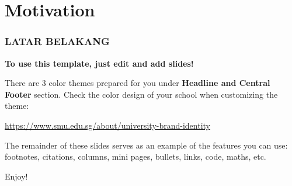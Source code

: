 \section{Motivation} %

\begin{frame}
    \frametitle{LATAR BELAKANG}
    \begin{center}
        \textbf{To use this template, just edit and add slides!} \newline
    \end{center}

    There are 3 color themes prepared for you under \textbf{Headline and Central Footer} section. 
    Check the color design of your school when customizing the theme: \newline



    \begin{center}
        \href{https://www.smu.edu.sg/about/university-brand-identity}{https://www.smu.edu.sg/about/university-brand-identity} \newline
    \end{center}

    The remainder of these slides serves as an example of the features you can use: footnotes, citations, columns, mini pages, bullets, links, code, maths, etc.

    \begin{center}
        {\Huge\calligra Enjoy!}
    \end{center}
\end{frame}